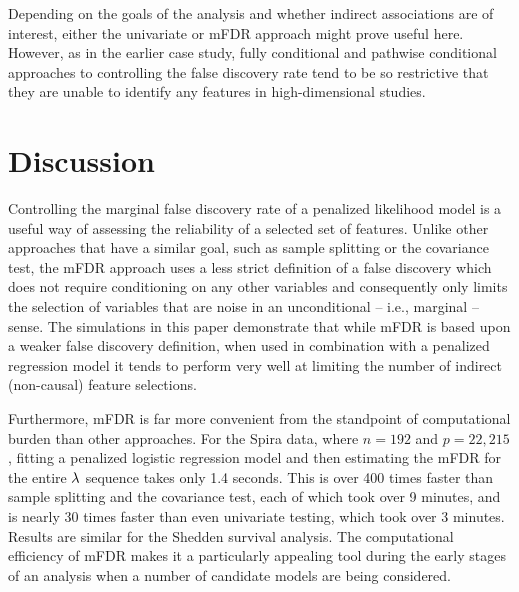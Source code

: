 Depending on the goals of the analysis and whether indirect associations are of interest, either the univariate or mFDR approach might prove useful here.
However, as in the earlier case study, fully conditional and pathwise conditional approaches to controlling the false discovery rate tend to be so restrictive that they are unable to identify any features in high-dimensional studies.

\section{Discussion}

Controlling the marginal false discovery rate of a penalized likelihood model is a useful way of assessing the reliability of a selected set of features. Unlike other approaches that have a similar goal, such as sample splitting or the covariance test, the mFDR approach uses a less strict definition of a false discovery which does not require conditioning on any other variables and consequently only limits the selection of variables that are noise in an unconditional -- i.e., marginal -- sense.  The simulations in this paper demonstrate that while mFDR is based upon a weaker false discovery definition, when used in combination with a penalized regression model it tends to perform very well at limiting the number of indirect (non-causal) feature selections.


Furthermore, mFDR is far more convenient from the standpoint of computational burden than other approaches. For the Spira data, where $n = 192$ and $p =22,215$, fitting a penalized logistic regression model and then estimating the mFDR for the entire $\lambda$ sequence takes only 1.4 seconds.  This is over 400 times faster than sample splitting and the covariance test, each of which took over 9 minutes, and is nearly 30 times faster than even univariate testing, which took over 3 minutes.
Results are similar for the Shedden survival analysis.  The computational efficiency of mFDR makes it a particularly appealing tool during the early stages of an analysis when a number of candidate models are being considered.

